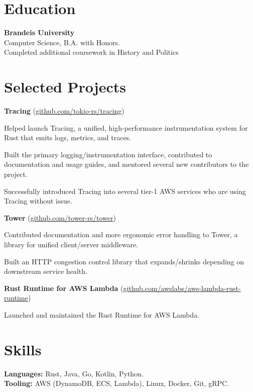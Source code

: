 \documentclass[10pt, a4paper]{article}
\newcommand{\note}[1]{\marginnote{\scriptsize #1}}
\renewenvironment{itemize}[1]{\begin{compactitem}#1}{\end{compactitem}}
\begin{document}
\section*{\textbf{Education}}
\note{Fall 2013—2017}\textbf{Brandeis University}\\
Computer Science, B.A. with Honors. \\
Completed additional coursework in History and Politics

\section*{\textbf{Selected Projects}}

\textbf{Tracing} (\href{https://github.com/tokio-rs/tracing}{github.com/tokio-rs/tracing})
\begin{itemize}
    \item Helped launch Tracing, a unified, high-performance instrumentation system for Rust that emits logs, metrics, and traces.
    \item Built the primary logging/instrumentation interface, contributed to documentation and usage guides, and mentored several new contributors to the project. 
    \item Successfully introduced Tracing into several tier-1 AWS services who are using Tracing without issue.
\end{itemize}

\textbf{Tower} (\href{https://github.com/tokio-rs/tower}{github.com/tower-rs/tower})
\begin{itemize}
    \item Contributed documentation and more ergonomic error handling to Tower, a library for unified client/server middleware.
    \item Built an HTTP congestion control library that expands/shrinks depending on downstream service health.
\end{itemize}

\textbf{Rust Runtime for AWS Lambda} (\href{https://github.com/awslabs/aws-lambda-rust-runtime}{github.com/awslabs/aws-lambda-rust-runtime})
\begin{itemize}
    \item Launched and maintained the Rust Runtime for AWS Lambda.
\end{itemize}
\section*{\textbf{Skills}}
\textbf{Languages:} Rust, Java, Go, Kotlin, Python. \\
\textbf{Tooling:} AWS (DynamoDB, ECS, Lambda), Linux, Docker, Git, gRPC.
\end{document}

